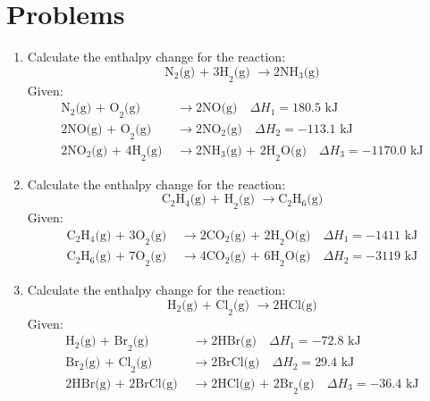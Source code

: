 \documentclass{article}
\begin{document}
\section*{Problems}
\begin{enumerate}
    \item Calculate the enthalpy change for the reaction:
    \[
    \text{N}_2\text{(g) + 3H}_2\text{(g) } \rightarrow \text{2NH}_3\text{(g)}
    \]
    Given:
    \begin{align*}
    \text{N}_2\text{(g) + O}_2\text{(g) } &\rightarrow \text{2NO(g)} \quad \Delta H_1 = 180.5 \text{ kJ} \\
    \text{2NO(g) + O}_2\text{(g) } &\rightarrow \text{2NO}_2\text{(g)} \quad \Delta H_2 = -113.1 \text{ kJ} \\
    \text{2NO}_2\text{(g) + 4H}_2\text{(g) } &\rightarrow \text{2NH}_3\text{(g) + 2H}_2\text{O(g)} \quad \Delta H_3 = -1170.0 \text{ kJ}
    \end{align*}

    \item Calculate the enthalpy change for the reaction:
    \[
    \text{C}_2\text{H}_4\text{(g) + H}_2\text{(g) } \rightarrow \text{C}_2\text{H}_6\text{(g)}
    \]
    Given:
    \begin{align*}
    \text{C}_2\text{H}_4\text{(g) + 3O}_2\text{(g) } &\rightarrow \text{2CO}_2\text{(g) + 2H}_2\text{O(g)} \quad \Delta H_1 = -1411 \text{ kJ} \\
    \text{C}_2\text{H}_6\text{(g) + 7O}_2\text{(g) } &\rightarrow \text{4CO}_2\text{(g) + 6H}_2\text{O(g)} \quad \Delta H_2 = -3119 \text{ kJ}
    \end{align*}

    \item Calculate the enthalpy change for the reaction:
    \[
    \text{H}_2\text{(g) + Cl}_2\text{(g) } \rightarrow \text{2HCl(g)}
    \]
    Given:
    \begin{align*}
    \text{H}_2\text{(g) + Br}_2\text{(g) } &\rightarrow \text{2HBr(g)} \quad \Delta H_1 = -72.8 \text{ kJ} \\
    \text{Br}_2\text{(g) + Cl}_2\text{(g) } &\rightarrow \text{2BrCl(g)} \quad \Delta H_2 = 29.4 \text{ kJ} \\
    \text{2HBr(g) + 2BrCl(g) } &\rightarrow \text{2HCl(g) + 2Br}_2\text{(g)} \quad \Delta H_3 = -36.4 \text{ kJ}
    \end{align*}

   
\end{enumerate}

\newpage
\
\newpage
\
\end{document}
